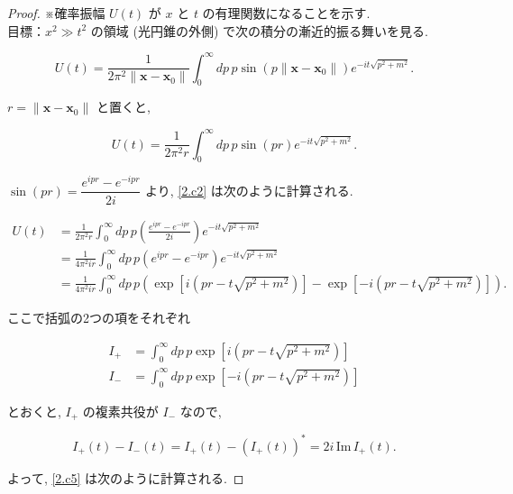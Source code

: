 \documentclass[a4paper,12pt]{article}
\begin{document}
\begin{proof} ※確率振幅 $U(t)$ が $x$ と $t$ の有理関数になることを示す.\\
目標：$x^2 \gg t^2$ の領域 (光円錐の外側) で次の積分の漸近的振る舞いを見る.

\begin{equation*}
  U(t) = \frac{1}{2\pi^2 \| \boldsymbol{x} - \boldsymbol{x}_0 \|} \int_0^\infty dp \, p \sin(p \| \boldsymbol{x} - \boldsymbol{x}_0 \|) e^{-it\sqrt{p^2 + m^2}}. \tag{2-1.c1}
\end{equation*}

$r = \| \boldsymbol{x} - \boldsymbol{x}_0 \|$ と置くと, 

\begin{equation*}\label{2.c2}
  U(t) = \frac{1}{2\pi^2 r} \int_0^\infty dp \, p \sin(p r) e^{-it\sqrt{p^2 + m^2}}. \tag{2-1.c2}
\end{equation*}

$\sin(p r) = \dfrac{e^{ipr} - e^{-ipr}}{2i}$ より, \eqref{2.c2} は次のように計算される.

\begin{align*}
  U(t) &= \frac{1}{2\pi^2 r} \int_0^\infty dp \, p \left( \frac{e^{ipr} - e^{-ipr}}{2i} \right) e^{-it\sqrt{p^2 + m^2}} \tag{2-1.c3}\\
  &= \frac{1}{4\pi^2 ir} \int_0^\infty dp \, p \left( e^{ipr} - e^{-ipr} \right) e^{-it\sqrt{p^2 + m^2}} \tag{2-1.c4} \\
  &= \frac{1}{4\pi^2 ir} \int_0^\infty dp \, p \left( \exp\left[i(pr - t\sqrt{p^2 + m^2})\right] - \exp\left[-i(pr - t\sqrt{p^2 + m^2})\right] \right). \label{2-1.c5}\tag{2-1.c5}
\end{align*}

ここで括弧の2つの項をそれぞれ

\begin{align*}
  I_+ &= \int_0^\infty dp \, p \exp\left[i(pr - t\sqrt{p^2 + m^2})\right] \tag{2-1.c6} \\
  I_- &= \int_0^\infty dp \, p \exp\left[-i(pr - t\sqrt{p^2 + m^2})\right] \tag{2-1.c7}
\end{align*}

とおくと, $I_+$ の複素共役が $I_-$ なので,

\begin{equation*}
  I_+(t) - I_-(t) = I_+(t) - (I_+(t))^* = 2i \, \textrm{Im}\, I_+(t). \tag{2-1.c8}
\end{equation*}

よって, \eqref{2.c5} は次のように計算される.


\end{proof}
\end{document}
